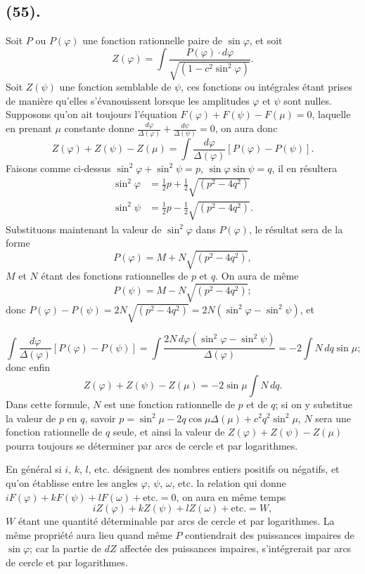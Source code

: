 \documentclass{article}
\begin{document}
\subsection*{(55).}

Soit $P$ ou $P(\varphi)$ une fonction rationnelle paire de $\sin\varphi$, et soit
\[ Z(\varphi)=\int\frac{P(\varphi)\cdot d\varphi}{\sqrt{(1-c^{2}\sin^{2}\varphi)}}. \]
Soit $Z(\psi)$ une fonction semblable de $\psi$, ces fonctions ou intégrales étant prises de manière qu'elles s'évanouissent lorsque les amplitudes $\varphi$ et $\psi$ sont nulles. Supposons qu'on ait toujours l'équation $F(\varphi)+F(\psi)-F(\mu)=0$, laquelle en prenant $\mu$ constante donne $\frac{d\varphi}{\Delta(\varphi)}+\frac{d\psi}{\Delta(\psi)}=0$, on aura donc
\[ Z(\varphi)+Z(\psi)-Z(\mu)=\int\frac{d\varphi}{\Delta(\varphi)}[P(\varphi)-P(\psi)]. \]
Faisons comme ci-dessus $\sin^{2}\varphi+\sin^{2}\psi=p$, $\sin\varphi\sin\psi=q$, il en résultera
\[ \begin{aligned} \sin^{2}\varphi&=\tfrac{1}{2}p+\tfrac{1}{2}\sqrt{(p^{2}-4q^{2})}\\ \sin^{2}\psi&=\tfrac{1}{2}p-\tfrac{1}{2}\sqrt{(p^{2}-4q^{2})}. \end{aligned} \]
Substituons maintenant la valeur de $\sin^{2}\varphi$ dans $P(\varphi)$, le résultat sera de la forme
\[ P(\varphi)=M+N\sqrt{(p^{2}-4q^{2})}, \]
$M$ et $N$ étant des fonctions rationnelles de $p$ et $q$. On aura de même
\[ P(\psi)=M-N\sqrt{(p^{2}-4q^{2})}; \]
donc $P(\varphi)-P(\psi)=2N\sqrt{(p^{2}-4q^{2})}=2N(\sin^{2}\varphi-\sin^{2}\psi)$, et

\[ \int\frac{d\varphi}{\Delta(\varphi)}[P(\varphi)-P(\psi)]=\int\frac{2N\,d\varphi(\sin^{2}\varphi-\sin^{2}\psi)}{\Delta(\varphi)}=-2\int N\,dq\sin\mu; \]
donc enfin
\[ Z(\varphi)+Z(\psi)-Z(\mu)=-2\sin\mu\int N\,dq. \]
Dans cette formule, $N$ est une fonction rationnelle de $p$ et de $q$; si on y substitue la valeur de $p$ en $q$, savoir $p=\sin^{2}\mu-2q\cos\mu\Delta(\mu)+c^{2}q^{2}\sin^{2}\mu$, $N$ sera une fonction rationnelle de $q$ seule, et ainsi la valeur de $Z(\varphi)+Z(\psi)-Z(\mu)$ pourra toujours se déterminer par arcs de cercle et par logarithmes.

En général si $i$, $k$, $l$, etc. désignent des nombres entiers positifs ou négatifs, et qu'on établisse entre les angles $\varphi$, $\psi$, $\omega$, etc. la relation qui donne $iF(\varphi)+kF(\psi)+lF(\omega)+\text{etc.}=0$, on aura en même temps
\[ iZ(\varphi)+kZ(\psi)+lZ(\omega)+\text{etc.}=W, \]
$W$ étant une quantité déterminable par arcs de cercle et par logarithmes. La même propriété aura lieu quand même $P$ contiendrait des puissances impaires de $\sin\varphi$; car la partie de $dZ$ affectée des puissances impaires, s'intégrerait par arcs de cercle et par logarithmes.
\end{document}
